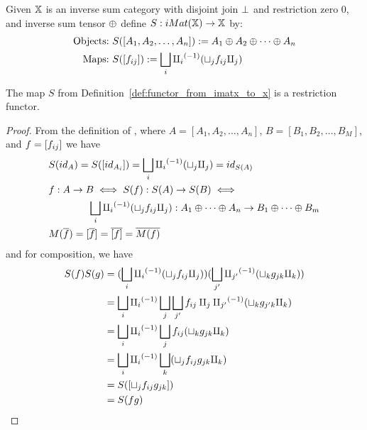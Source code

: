 \begin{definition}\label{def:functor_from_imatx_to_x}
  Given $\mathbb{X}$ is an inverse sum category with disjoint join $\perp$ and restriction zero $0$,
  and inverse sum tensor $\oplus$ define $S:iMat({\mathbb{X}}) \to \mathbb{X}$ by:
  \begin{align*}
    \text{Objects:}\ &S([A_1,A_2, \ldots, A_n]) := A_1\oplus A_2\oplus\cdots\oplus A_n\\
    \text{Maps:}\ &S([f_{ij}]) := \bigsqcup_i {\amalg_{i}}^{(-1)} (\sqcup_j f_{ij} \amalg_{j})
  \end{align*}
\end{definition}

\begin{lemma}\label{lem:s_is_a_functor}
  The map $S$ from Definition~\ref{def:functor_from_imatx_to_x} is a restriction functor.
\end{lemma}
\begin{proof}
  From the definition of \imatx, where $A = [A_1,A_2,\ldots,A_n]$, $B=[B_1,B_2,\ldots,B_M]$,
  and $f = [f_{ij}]$ we have
  \begin{align*}
    &S(id_A)  = S([id_{A_i}]) = \bigsqcup_i {\amalg_{i}}^{(-1)} (\sqcup_j \amalg_{j}) = id_{S(A)}\\
    &f: A\to B  \iff S(f):S(A)\to S(B) \iff \\
    &\qquad \qquad  \bigsqcup_i {\amalg_{i}}^{(-1)} (\sqcup_j f_{ij} \amalg_{j}) : A_1\oplus\cdots\oplus A_n \to B_1\oplus\cdots\oplus B_m\\
    &M(\overline{f}) = [\overline{f}] = \overline{[f]} = \overline{M(f)}
  \end{align*}
  and for composition, we have
  \begin{align*}
    S(f)S(g) & = (\bigsqcup_i {\amalg_{i}}^{(-1)} (\sqcup_j f_{ij} \amalg_{j}))
                  (\bigsqcup_{j'} {\amalg_{j'}}^{(-1)} (\sqcup_k g_{jk} \amalg_{k})) \\
    &= \bigsqcup_i {\amalg_{i}}^{(-1)} \bigsqcup_j \bigsqcup_{j'} f_{ij} \amalg_{j} {\amalg_{j'}}^{(-1)}
            (\sqcup_k g_{j'k} \amalg_{k}) \\
    &= \bigsqcup_i {\amalg_{i}}^{(-1)} \bigsqcup_j  f_{ij} (\sqcup_k g_{jk} \amalg_{k}) \\
    &= \bigsqcup_i {\amalg_{i}}^{(-1)} \bigsqcup_k (\sqcup_j  f_{ij}  g_{jk} \amalg_{k}) \\
    &= S([\sqcup_j f_{ij} g_{jk}]) \\
    &= S(f g)
  \end{align*}

\end{proof}

